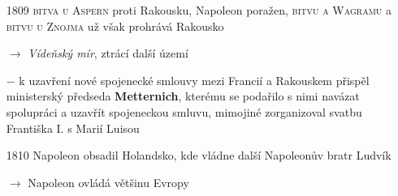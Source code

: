 \documentclass{article}
\begin{document}
\begin{itemize}
    \vspace{-0.5em}
    \setlength\itemsep{0.15em}
    \item[1809] \textsc{bitva u Aspern} proti Rakousku, Napoleon poražen, \textsc{bitvu a Wagramu} a \textsc{bitvu u Znojma} už však prohrává Rakousko
    \item[$\rightarrow$] \textit{Vídeňský mír}, ztrácí další území
    \item[$-$] k uzavření nové spojenecké smlouvy mezi Francií a Rakouskem přispěl ministerský předseda \textbf{Metternich}, kterému se podařilo s nimi navázat spolupráci a uzavřít spojeneckou smluvu, mimojiné zorganizoval svatbu Františka I. s Marií Luisou
    \item[1810] Napoleon obsadil Holandsko, kde vládne další Napoleonův bratr Ludvík
    \item[$\rightarrow$] Napoleon ovládá většinu Evropy
\end{itemize}
\end{document}
